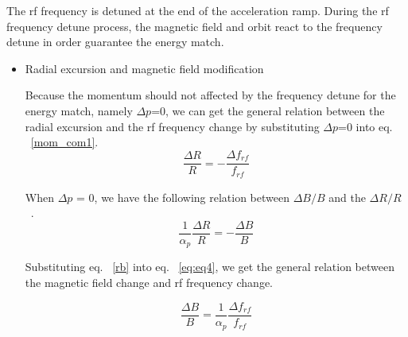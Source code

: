 The rf frequency is detuned at the end of the acceleration ramp. During the rf frequency detune process, the magnetic field and orbit react to the frequency detune in order guarantee the energy match.

\begin {itemize}
\item Radial excursion and magnetic field modification

Because the momentum should not affected by the frequency detune for the energy match, namely $\Delta p$=0, we can get the general relation between the radial excursion and the rf frequency change by substituting $\Delta p$=0 into eq. ~\ref{mom_com1}.
\begin{equation}
\frac{\Delta{R}}{R}= - \frac{\Delta f_{\mathit{rf}}}{f_{\mathit{rf}}} 
\label{eq:eq4}
\end{equation}



When $\Delta p$ = 0, we have the following relation between $\Delta B/B$ and the $\Delta R/R$ ~\cite{werkema_differential_2001}.
%
%
\begin{equation}
\frac{1}{\alpha_p} \frac{\Delta R}{R} = -\frac{\Delta{B}}{B}\label{rb}
\end{equation}

Substituting eq. ~\ref{rb} into eq. ~\ref{eq:eq4}, we get the general relation between the magnetic field change and rf frequency change.

\begin{equation}
\frac{\Delta{B}}{B}= \frac{1}{\alpha_p} \frac{\Delta f_{\mathit{rf}}}{f_{\mathit{rf}}} 
\label{eq:eq5}
\end{equation}
\end {itemize}

